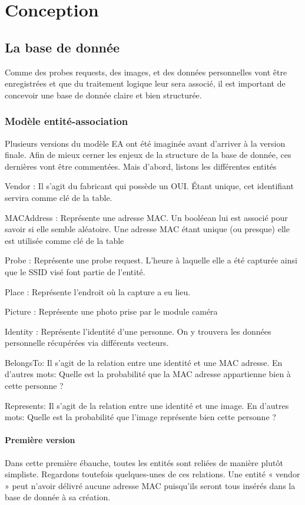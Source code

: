 \chapter{Conception}
\label{ch:conception}

\section{La base de donnée}
\label{sec:database}
Comme des probes requests, des images, et des données personnelles vont être enregistrées et que du traitement
logique leur sera associé, il est important de concevoir une base de donnée claire et bien structurée.

\subsection{Modèle entité-association}
Plusieurs versions du modèle EA ont été imaginée avant d’arriver à la version finale. Afin de mieux cerner les enjeux
de la structure de la base de donnée, ces dernières vont être commentées. Mais d’abord, listons les différentes
entités

Vendor : Il s’agit du fabricant qui possède un OUI. Étant unique, cet identifiant servira comme clé de la table.

MACAddress : Représente une adresse MAC. Un booléean lui est associé pour savoir si elle semble aléatoire. Une
adresse MAC étant unique (ou presque) elle est utilisée comme clé de la table

Probe : Représente une probe request. L’heure à laquelle elle a été capturée ainsi que le SSID visé font partie de
l’entité.

Place : Représente l’endroit où la capture a eu lieu.

Picture : Représente une photo prise par le module caméra

Identity : Représente l’identité d’une personne. On y trouvera les données personnelle récupérées via différents
vecteurs.

BelongsTo: Il s'agit de la relation entre une identité et une MAC adresse. En d'autres mots:
Quelle est la probabilité que la MAC adresse appartienne bien à cette personne ?

Represents: Il s'agit de la relation entre une identité et une image. En d'autres mots:
Quelle est la probabilité que l'image représente bien cette personne ?


\subsubsection{Première version}
Dans cette première ébauche, toutes les entités sont reliées de manière plutôt simpliste. Regardons toutefois
quelques-unes de ces relations.
Une entité « vendor » peut n’avoir délivré aucune adresse MAC puisqu’ils seront tous insérés dans la base de donnée
à sa création.

